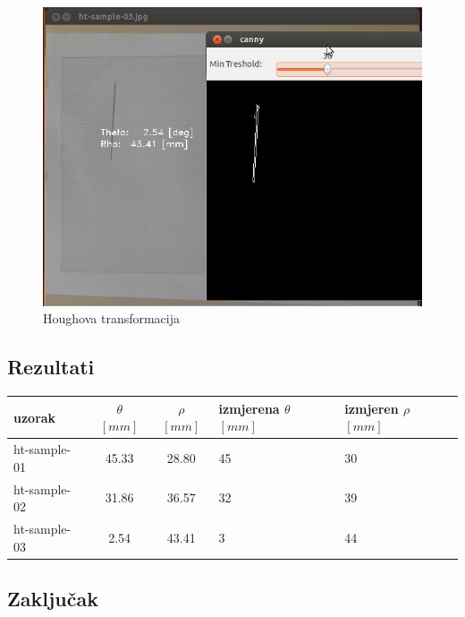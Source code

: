 \begin{figure}[h]
\centering
\includegraphics[scale=0.32]{images/lab3-sample-03.png}
\caption{Houghova transformacija}
\label{fig:lab3-sample-03}
\end{figure}

\subsection{Rezultati}

\begin{center}
\centering
\begin{tabular}
{ l || c | c | p{1.6 cm} | p{1.6 cm}  }
{uzorak}  & {\(\theta\) $[mm]$ } & {\(\rho \) $[mm]$} & {izmjerena \(\theta\) $[mm]$} & {izmjeren \(\rho\) $[mm]$} \\ \hline
ht-sample-01 & 45.33 & 28.80 & 45 & 30 \\ \hline
ht-sample-02 & 31.86 & 36.57 & 32 & 39 \\ \hline
ht-sample-03 & 2.54 & 43.41 & 3 & 44 \\ 
\end{tabular}
\end{center}

\newpage
\subsection{Zaključak}

